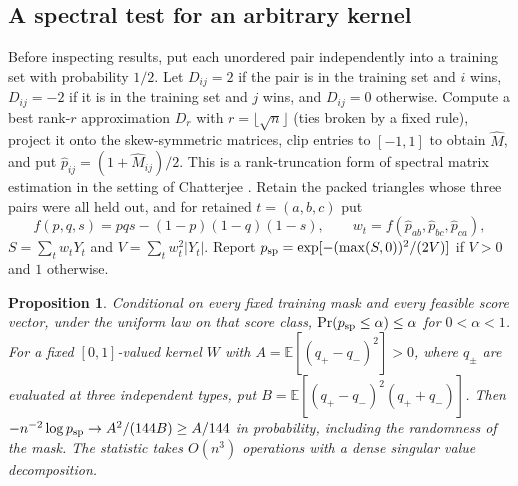 \documentclass[11pt,a4paper]{article}
\newtheorem{proposition}[theorem]{Proposition}
\theoremstyle{definition}
\newcommand{\E}{\mathbb E}
\begin{document}
\subsection{A spectral test for an arbitrary kernel}\label{sec:kernel-test}

Before inspecting results, put each unordered pair independently into a training set with probability $1/2$. Let $D_{ij}=2$ if the pair is in the training set and $i$ wins, $D_{ij}=-2$ if it is in the training set and $j$ wins, and $D_{ij}=0$ otherwise. Compute a best rank-$r$ approximation $D_r$ with $r=\lfloor\sqrt n\rfloor$ (ties broken by a fixed rule), project it onto the skew-symmetric matrices, clip entries to $[-1,1]$ to obtain $\widehat M$, and put $\widehat p_{ij}=(1+\widehat M_{ij})/2$. This is a rank-truncation form of spectral matrix estimation in the setting of Chatterjee \cite{usvt}. Retain the packed triangles whose three pairs were all held out, and for retained $t=(a,b,c)$ put
\[
 f(p,q,s)=pqs-(1-p)(1-q)(1-s),\qquad
 w_t=f(\widehat p_{ab},\widehat p_{bc},\widehat p_{ca}),
\]
$S=\sum_t w_tY_t$ and $V=\sum_t w_t^2|Y_t|$. Report $p_{\rm sp}=\exp[-(\max(S,0))^2/(2V)]$ if $V>0$ and $1$ otherwise.

\begin{proposition}\label{prop:kernel-test}
Conditional on every fixed training mask and every feasible score vector, under the uniform law on that score class, $\Pr(p_{\rm sp}\le\alpha)\le\alpha$ for $0<\alpha<1$. For a fixed $[0,1]$-valued kernel $W$ with $A=\E[(q_+-q_-)^2]>0$, where $q_\pm$ are evaluated at three independent types, put $B=\E[(q_+-q_-)^2(q_++q_-)]$. Then $-n^{-2}\log p_{\rm sp}\to A^2/(144B)\ge A/144$ in probability, including the randomness of the mask. The statistic takes $O(n^3)$ operations with a dense singular value decomposition.
\end{proposition}
\end{document}
